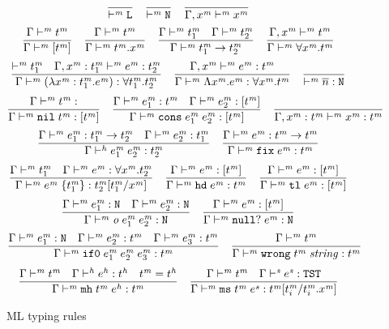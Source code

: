 \begin{figure}[p]
\[
\frac
{}
{ \vdash^{\mathit{m}} \mathtt{L}}
\quad
\frac
{}
{ \vdash^{\mathit{m}} \mathtt{N}}
\quad
\frac
{}
{\Gamma , x^{\mathit{m}} \vdash^{\mathit{m}} x^{\mathit{m}}}
\]
\[
\frac
{\Gamma \vdash^{\mathit{m}} t^{\mathit{m}}}
{\Gamma \vdash^{\mathit{m}} [t^{\mathit{m}}]}
\quad
\frac
{\Gamma \vdash^{\mathit{m}} t^{\mathit{m}}}
{\Gamma \vdash^{\mathit{m}} t^{\mathit{m}} . x^{\mathit{m}}}
\quad
\frac
{\Gamma \vdash^{\mathit{m}} t^{\mathit{m}}_{1} \quad \Gamma \vdash^{\mathit{m}} t^{\mathit{m}}_{2}}
{\Gamma \vdash^{\mathit{m}} t^{\mathit{m}}_{1} \rightarrow t^{\mathit{m}}_{2}}
\quad
\frac
{\Gamma, x^{\mathit{m}} \vdash^{\mathit{m}} t^{\mathit{m}}}
{\Gamma \vdash^{\mathit{m}} \forall x^{\mathit{m}} . t^{\mathit{m}}}
\]
\bigskip
\[
\frac
{ \vdash^{\mathit{m}} t^{\mathit{m}}_{1} \quad \Gamma , x^{\mathit{m}} : t^{\mathit{m}}_{1} \vdash^{\mathit{m}} e^{\mathit{m}} : t^{\mathit{m}}_{2}}
{\Gamma \vdash^{\mathit{m}} (\lambda x^{\mathit{m}} : t^{\mathit{m}}_{1} . e^{\mathit{m}}) : \forall t^{\mathit{m}}_{1} . t^{\mathit{m}}_{2}}
\quad
\frac
{\Gamma , x^{\mathit{m}} \vdash^{\mathit{m}} e^{\mathit{m}} : t^{\mathit{m}}}
{\Gamma \vdash^{\mathit{m}} \Lambda x^{\mathit{m}} . e^{\mathit{m}} : \forall x^{\mathit{m}} . t^{\mathit{m}}}
\quad
\frac
{}
{ \vdash^{\mathit{m}} \overline{n} : \mathtt{N}}
\]
\[
\frac
{\judem{\env}{\vartym}}
{\judem{\env}{\expnils{\vartym}}{\tylist{\vartym}}}
\quad
\frac
{\judem{\env}{\first{\varexpm}}{\vartym} \quad \judem{\env}{\second{\varexpm}}{\tylist{\vartym}}}
{\judem{\env}{\expcons{\first{\varexpm}}{\second{\varexpm}}}{\tylist{\vartym}}}
\quad
\frac
{}
{\judem{\envexte{\varvarm}{\vartym}}{\varvarm}{\vartym}}
\]
\[
\frac
{\Gamma \vdash^{\mathit{m}} e^{\mathit{m}}_{1} : t^{\mathit{m}}_{1} \rightarrow t^{\mathit{m}}_{2} \quad \Gamma \vdash^{\mathit{m}} e^{\mathit{m}}_{2} : t^{\mathit{m}}_{1}}
{\Gamma\vdash^{\mathit{h}}e^{\mathit{m}}_{1} \; e^{\mathit{m}}_{2}:t^{\mathit{m}}_{2}}
\quad
\frac
{\Gamma \vdash^{\mathit{m}} e^{\mathit{m}} : t^{\mathit{m}} \rightarrow t^{\mathit{m}}}
{\Gamma \vdash^{\mathit{m}} \mathtt{fix} \; e^{\mathit{m}} : t^{\mathit{m}}}
\]
\[
\frac
{\Gamma \vdash^{\mathit{m}} t^{\mathit{m}}_{1} \quad \Gamma \vdash^{\mathit{m}} e^{\mathit{m}} : \forall x^{\mathit{m}} . t^{\mathit{m}}_{2}}
{\Gamma \vdash^{\mathit{m}} e^{\mathit{m}} \; \lbrace t^{\mathit{m}}_{1} \rbrace : t^{\mathit{m}}_{2}[t^{\mathit{m}}_{1}/x^{\mathit{m}}]}
\quad
\frac
{\Gamma \vdash^{\mathit{m}} e^{\mathit{m}} : [t^{\mathit{m}}]}
{\Gamma \vdash^{\mathit{m}} \mathtt{hd} \; e^{\mathit{m}} : t^{\mathit{m}}}
\quad
\frac
{\Gamma \vdash^{\mathit{m}} e^{\mathit{m}} : [t^{\mathit{m}}]}
{\Gamma \vdash^{\mathit{m}} \mathtt{tl} \; e^{\mathit{m}} : [t^{\mathit{m}}]}
\]
\[
\frac
{\Gamma \vdash^{\mathit{m}} e^{\mathit{m}}_{1} : \mathtt{N} \quad \Gamma \vdash^{\mathit{m}} e^{\mathit{m}}_{2} : \mathtt{N}}
{\Gamma \vdash^{\mathit{m}} \mathit{o} \; e^{\mathit{m}}_{1} \; e^{\mathit{m}}_{2} : \mathtt{N}}
\quad
\frac
{\Gamma \vdash^{\mathit{m}} e^{\mathit{m}} : [t^{\mathit{m}}]}
{\Gamma \vdash^{\mathit{m}} \mathtt{null?} \; e^{\mathit{m}} : \mathtt{N}}
\]
\[
\frac
{\Gamma \vdash^{\mathit{m}} e^{\mathit{m}}_{1} : \mathtt{N} \quad \Gamma \vdash^{\mathit{m}} e^{\mathit{m}}_{2} : t^{\mathit{m}} \quad \Gamma \vdash^{\mathit{m}} e^{\mathit{m}}_{3} : t^{\mathit{m}}}
{\Gamma \vdash^{\mathit{m}} \mathtt{if0} \; e^{\mathit{m}}_{1} \; e^{\mathit{m}}_{2} \; e^{\mathit{m}}_{3} : t^{\mathit{m}}}
\quad
\frac
{\Gamma \vdash^{\mathit{m}} t^{\mathit{m}}}
{\Gamma \vdash^{\mathit{m}} \mathtt{wrong} \; t^{\mathit{m}} \; \mathit{string} : t^{\mathit{m}}}
\]
\[
\frac
{\Gamma \vdash^{\mathit{m}} t^{\mathit{m}} \quad \Gamma \vdash^{\mathit{h}} e^{\mathit{h}} : t^{\mathit{h}} \quad t^{\mathit{m}}=t^{\mathit{h}}}
{\Gamma \vdash^{\mathit{m}} \mathtt{mh} \; t^{\mathit{m}} \; e^{\mathit{h}} : t^{\mathit{m}}}
\quad
\frac
{\Gamma \vdash^{\mathit{m}} t^{\mathit{m}} \quad \Gamma \vdash^{\mathit{s}} e^{\mathit{s}} : \mathtt{TST}}
{\Gamma \vdash^{\mathit{m}} \mathtt{ms} \; t^{\mathit{m}} \; e^{\mathit{s}} : t^{\mathit{m}}[t^{\mathit{m}}_{i}/t^{\mathit{m}}_{i} . x^{\mathit{m}}]}
\]
\caption{ML typing rules}
\label{mtr}
\end{figure}
